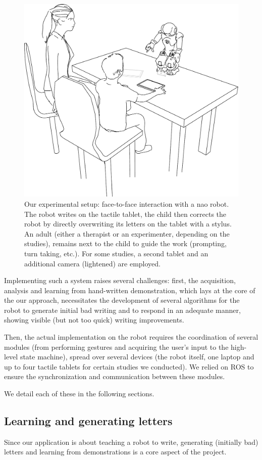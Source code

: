 \documentclass{sig-alternate}
\begin{document}
   \begin{figure}
       \centering
       \includegraphics[width=0.6\columnwidth]{experimental_setup}
       \caption{\small Our experimental setup: face-to-face interaction with a {\sc
           nao} robot.  The robot writes on the tactile tablet, the child then
           corrects the robot by directly overwriting its letters on the tablet
           with a stylus. An adult (either a therapist or an experimenter,
           depending on the studies), remains next to the child to guide the work
           (prompting, turn taking, etc.). For some studies, a second tablet and an
           additional camera (lightened) are employed.}

       \label{experimental_setup}
   \end{figure}

Implementing such a system raises several challenges: first, the acquisition,
analysis and learning from hand-written demonstration, which lays at the core of the
our approach, necessitates the development of several algorithms for the robot to generate
initial bad writing and to respond in an adequate manner, showing visible (but
not too quick) writing improvements.

Then, the actual implementation on the robot requires the coordination of
several modules (from performing gestures and acquiring the user's input to
the high-level state machine), spread over several devices (the robot itself,
one laptop and up to four tactile tablets for certain studies we conducted). We
relied on ROS to ensure the synchronization and communication between these
modules.

We detail each of these in the following sections.

\subsection{Learning and generating letters}
Since our application is about teaching a robot to write, generating (initially
bad) letters and learning from demonstrations is a core aspect of the project.
\end{document}
